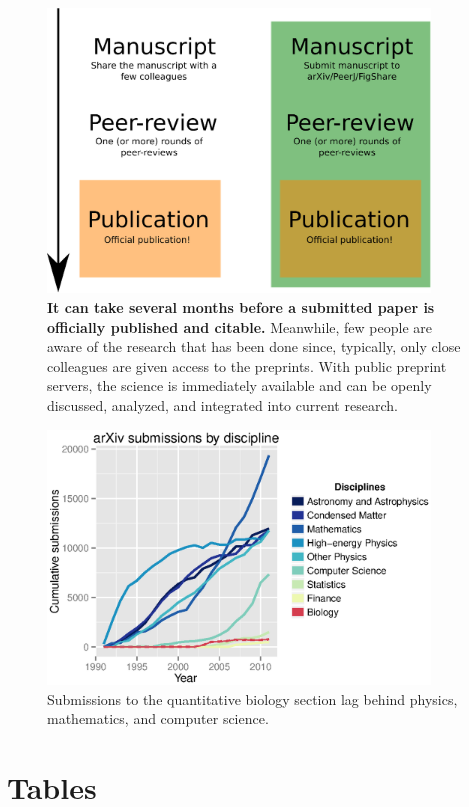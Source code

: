 \documentclass[10pt]{article}
\begin{document}
\begin{figure}[!ht]
\begin{center}
\includegraphics[width=4in]{map.eps}
\end{center}
\caption { {\bf It can take several months before a submitted paper is
officially published and citable.} Meanwhile, few people are aware of the
research that has been done since, typically, only close colleagues are
given access to the preprints. With public preprint servers, the science is
immediately available and can be openly discussed, analyzed, and integrated
into current research. }
\label{fig:map}
\end{figure}

\begin{figure}[!ht]
\begin{center}
\includegraphics[width=4in]{figure_2.eps}
\end{center}
\caption { Submissions to the quantitative biology section lag behind
physics, mathematics, and computer science.
}
\label{fig:arxiv}
\end{figure}

\newpage
\section*{Tables}
\end{document}
